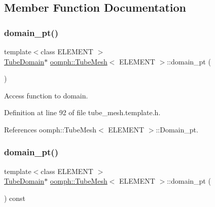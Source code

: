 \subsection{Member Function Documentation}
\mbox{\label{classoomph_1_1TubeMesh_a96715b52dbbccaaf89d722a05e57e28a}} 
\subsubsection{\texorpdfstring{domain\+\_\+pt()}{domain\_pt()}\hspace{0.1cm}{\footnotesize\ttfamily [1/2]}}
{\footnotesize\ttfamily template$<$class E\+L\+E\+M\+E\+NT $>$ \\
\hyperlink{classoomph_1_1TubeDomain}{Tube\+Domain}$\ast$ \hyperlink{classoomph_1_1TubeMesh}{oomph\+::\+Tube\+Mesh}$<$ E\+L\+E\+M\+E\+NT $>$\+::domain\+\_\+pt (\begin{DoxyParamCaption}{ }\end{DoxyParamCaption})\hspace{0.3cm}{\ttfamily [inline]}}



Access function to domain. 



Definition at line 92 of file tube\+\_\+mesh.\+template.\+h.



References oomph\+::\+Tube\+Mesh$<$ E\+L\+E\+M\+E\+N\+T $>$\+::\+Domain\+\_\+pt.

\mbox{\label{classoomph_1_1TubeMesh_a223a82a89304553d71b279aa6fe045fd}} 
\subsubsection{\texorpdfstring{domain\+\_\+pt()}{domain\_pt()}\hspace{0.1cm}{\footnotesize\ttfamily [2/2]}}
{\footnotesize\ttfamily template$<$class E\+L\+E\+M\+E\+NT $>$ \\
\hyperlink{classoomph_1_1TubeDomain}{Tube\+Domain}$\ast$ \hyperlink{classoomph_1_1TubeMesh}{oomph\+::\+Tube\+Mesh}$<$ E\+L\+E\+M\+E\+NT $>$\+::domain\+\_\+pt (\begin{DoxyParamCaption}{ }\end{DoxyParamCaption}) const\hspace{0.3cm}{\ttfamily [inline]}}



